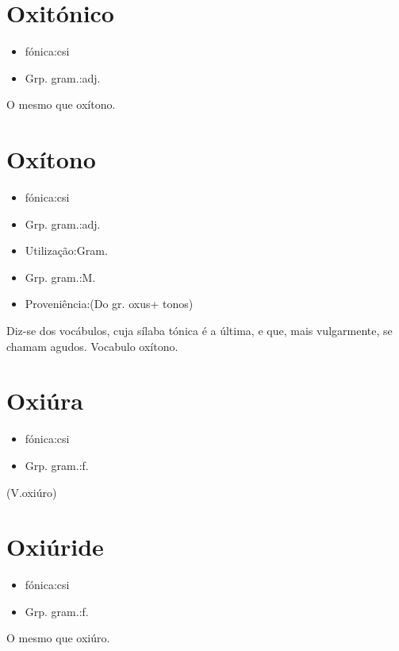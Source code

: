 \section{Oxitónico}
\begin{itemize}
\item {fónica:csi}
\end{itemize}
\begin{itemize}
\item {Grp. gram.:adj.}
\end{itemize}
O mesmo que \textunderscore oxítono\textunderscore .
\section{Oxítono}
\begin{itemize}
\item {fónica:csi}
\end{itemize}
\begin{itemize}
\item {Grp. gram.:adj.}
\end{itemize}
\begin{itemize}
\item {Utilização:Gram.}
\end{itemize}
\begin{itemize}
\item {Grp. gram.:M.}
\end{itemize}
\begin{itemize}
\item {Proveniência:(Do gr. \textunderscore oxus\textunderscore  + \textunderscore tonos\textunderscore )}
\end{itemize}
Diz-se dos vocábulos, cuja sílaba tónica é a última, e que, mais vulgarmente, se chamam agudos.
Vocabulo oxítono.
\section{Oxiúra}
\begin{itemize}
\item {fónica:csi}
\end{itemize}
\begin{itemize}
\item {Grp. gram.:f.}
\end{itemize}
(V.oxiúro)
\section{Oxiúride}
\begin{itemize}
\item {fónica:csi}
\end{itemize}
\begin{itemize}
\item {Grp. gram.:f.}
\end{itemize}
O mesmo que \textunderscore oxiúro\textunderscore .
